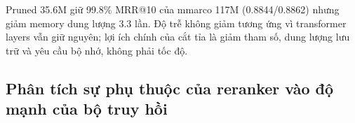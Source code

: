 \documentclass[../DoAn.tex]{subfiles}
\begin{document}
\begin{table}[H]
    \centering
    \caption{Chất lượng pruned reranker sau tinh chỉnh}
    \label{tab:pruned-reranker-quality}
    {\small
    \setlength{\tabcolsep}{4pt}
    }
\end{table}

Pruned 35.6M giữ 99.8\% MRR@10 của mmarco 117M (0.8844/0.8862) nhưng giảm memory dung lượng 3.3 lần. Độ trễ không giảm tương ứng vì transformer layers vẫn giữ nguyên; lợi ích chính của cắt tỉa là giảm tham số, dung lượng lưu trữ và yêu cầu bộ nhớ, không phải tốc độ.

\subsection{Phân tích sự phụ thuộc của reranker vào độ mạnh của bộ truy hồi}
\label{subsection:4.2.4}
\end{document}
